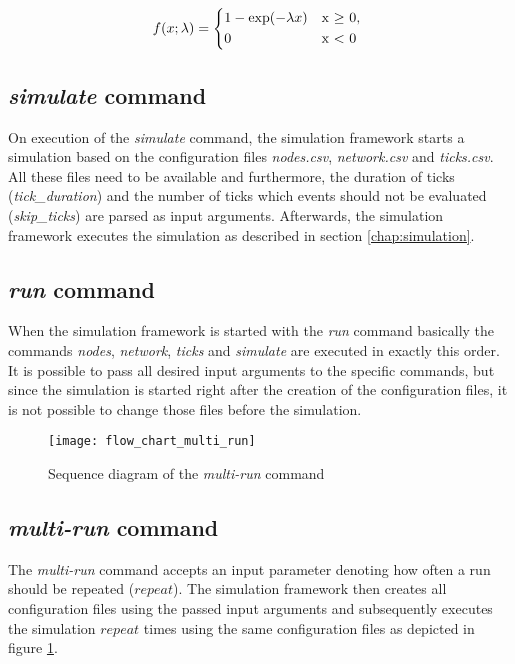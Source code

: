  \begin{equation} \label{eq:exponential}
f(x; \lambda) = \begin{cases*}
        1 - \exp(-\lambda x) & x  $\geq$ 0, \\
        0                                    &  x < 0
        \end{cases*}
\end{equation}

\subsection{\textit{simulate} command} \label{chap:simulate_command}

On execution of the \textit{simulate} command, the simulation framework starts a simulation based on the configuration files \textit{nodes.csv}, \textit{network.csv} and \textit{ticks.csv}.
All these files need to be available and furthermore, the duration of ticks (\textit{tick\_duration}) and the number of ticks which events should not be evaluated (\textit{skip\_ticks}) are parsed as input arguments.
Afterwards, the simulation framework executes the simulation as described in section \ref{chap:simulation}.

\subsection{\textit{run} command} \label{chap:run_command}

When the simulation framework is started with the \textit{run} command basically the commands \textit{nodes}, \textit{network}, \textit{ticks} and \textit{simulate} are executed in exactly this order.
It is possible to pass all desired input arguments to the specific commands, but since the simulation is started right after the creation of the configuration files, it is not possible to change those files before the simulation.

\begin{figure}[t]
\texttt{[image: flow\_chart\_multi\_run]}
\centering
\caption{Sequence diagram of the \textit{multi-run} command}
\label{fig:flow_chart_multi_run}
\end{figure}

\subsection{\textit{multi-run} command} \label{chap:multi_run_command}

The \textit{multi-run} command accepts an input parameter denoting how often a run should be repeated ($repeat$).
The simulation framework then creates all configuration files using the passed input arguments and subsequently executes the simulation $repeat$ times using the same configuration files as depicted in figure \ref{fig:flow_chart_multi_run}.

